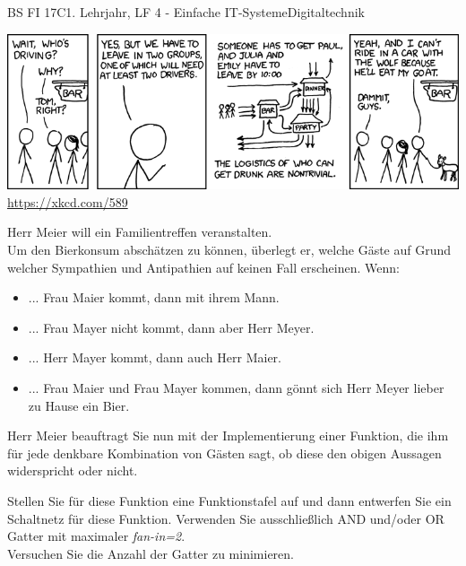 \documentclass[oneside,openany,headings=optiontotoc,11pt,numbers=noenddot]{scrreprt}
\begin{document}
	\begin{worksheet}{BS FI 17C}{1. Lehrjahr, LF 4 - Einfache IT-Systeme}{Digitaltechnik}
		\begin{framed}
			\noindent
			\includegraphics[scale=0.62]{Bilder/logic_party.png}\\
			\tiny{\color{codegray}\url{https://xkcd.com/589}}
		\end{framed}
		\begin{framed}
			\noindent
			Herr Meier will ein Familientreffen veranstalten.\\
			Um den Bierkonsum abschätzen zu können, überlegt er, welche Gäste auf Grund welcher Sympathien und Antipathien auf keinen Fall erscheinen. Wenn:
			\begin{itemize}
				\item ... Frau Maier kommt, dann mit ihrem Mann.
				\item ... Frau Mayer nicht kommt, dann aber Herr Meyer.
				\item ... Herr Mayer kommt, dann auch Herr Maier.
				\item ... Frau Maier und Frau Mayer kommen, dann gönnt sich Herr Meyer lieber zu Hause ein Bier.
			\end{itemize}
		\par\bigskip\noindent
		Herr Meier beauftragt Sie nun mit der Implementierung einer Funktion, die ihm für jede denkbare Kombination von Gästen sagt, ob diese den obigen Aussagen widerspricht oder nicht.\par\bigskip\noindent
		Stellen Sie für diese Funktion eine Funktionstafel auf und dann entwerfen Sie ein Schaltnetz für diese Funktion. Verwenden Sie ausschließlich AND und/oder OR Gatter mit maximaler \textit{fan-in=2}.\\
		Versuchen Sie die Anzahl der Gatter zu minimieren.
		\end{framed}
	\end{worksheet}
\end{document}
